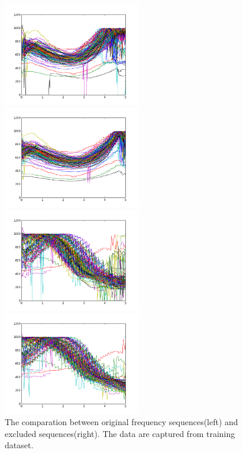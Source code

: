 \documentclass[a4paper, 11pt]{article} %
\begin{document}
\begin{figure}[H]
\begin{minipage}{0.5\linewidth}
\end{minipage}
\begin{minipage}{0.5\linewidth}
\centerline{\includegraphics[width=6.0cm]{figure/originf0_3.png}}
\end{minipage}
\hfill
\begin{minipage}{0.5\linewidth}
\centerline{\includegraphics[width=6.0cm]{figure/exclude_3.png}}
\end{minipage}
\vfill
\begin{minipage}{0.5\linewidth}
\centerline{\includegraphics[width=6.0cm]{figure/originf0_4.png}}
\end{minipage}
\hfill
\begin{minipage}{0.5\linewidth}
\centerline{\includegraphics[width=6.0cm]{figure/exclude_4.png}}
\end{minipage}
\caption{The comparation between original frequency sequences(left) and excluded sequences(right). The data are captured from training dataset.}
\label{fig_originf0}
\end{figure}
\newpage
\end{document}
